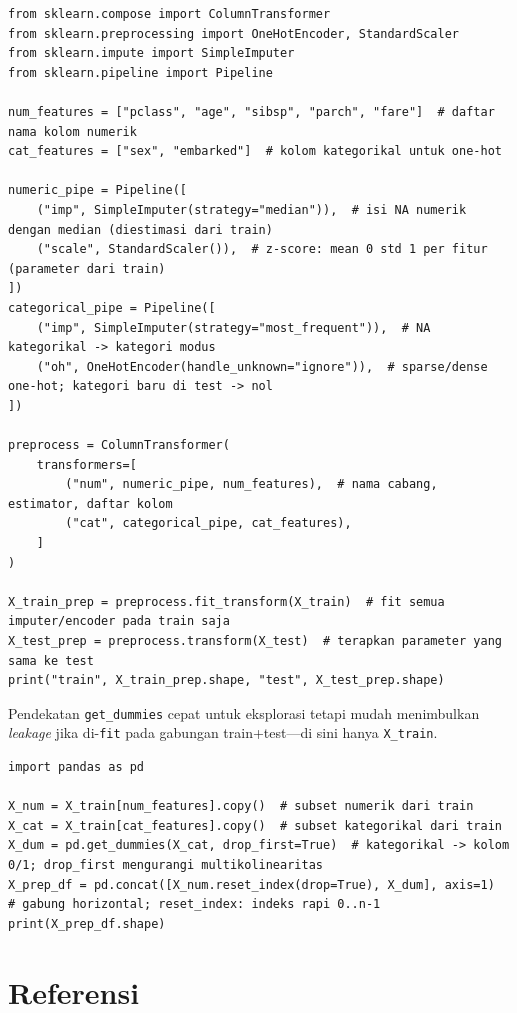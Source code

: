\documentclass[../main.tex]{subfiles}
\begin{document}
\begin{lstlisting}[caption=ColumnTransformer + imputer (polar anti-leakage)]
from sklearn.compose import ColumnTransformer
from sklearn.preprocessing import OneHotEncoder, StandardScaler
from sklearn.impute import SimpleImputer
from sklearn.pipeline import Pipeline

num_features = ["pclass", "age", "sibsp", "parch", "fare"]  # daftar nama kolom numerik
cat_features = ["sex", "embarked"]  # kolom kategorikal untuk one-hot

numeric_pipe = Pipeline([
    ("imp", SimpleImputer(strategy="median")),  # isi NA numerik dengan median (diestimasi dari train)
    ("scale", StandardScaler()),  # z-score: mean 0 std 1 per fitur (parameter dari train)
])
categorical_pipe = Pipeline([
    ("imp", SimpleImputer(strategy="most_frequent")),  # NA kategorikal -> kategori modus
    ("oh", OneHotEncoder(handle_unknown="ignore")),  # sparse/dense one-hot; kategori baru di test -> nol
])

preprocess = ColumnTransformer(
    transformers=[
        ("num", numeric_pipe, num_features),  # nama cabang, estimator, daftar kolom
        ("cat", categorical_pipe, cat_features),
    ]
)

X_train_prep = preprocess.fit_transform(X_train)  # fit semua imputer/encoder pada train saja
X_test_prep = preprocess.transform(X_test)  # terapkan parameter yang sama ke test
print("train", X_train_prep.shape, "test", X_test_prep.shape)
\end{lstlisting}

\MulaiPenjelasanKode Pendekatan \texttt{get\_dummies} cepat untuk eksplorasi tetapi mudah menimbulkan \textit{leakage} jika di-\texttt{fit} pada gabungan train+test---di sini hanya \texttt{X\_train}. \SelesaiPenjelasanKode

\begin{lstlisting}[caption=Alternatif cepat: pandas get\_dummies (tanpa pipeline)]
import pandas as pd

X_num = X_train[num_features].copy()  # subset numerik dari train
X_cat = X_train[cat_features].copy()  # subset kategorikal dari train
X_dum = pd.get_dummies(X_cat, drop_first=True)  # kategorikal -> kolom 0/1; drop_first mengurangi multikolinearitas
X_prep_df = pd.concat([X_num.reset_index(drop=True), X_dum], axis=1)  # gabung horizontal; reset_index: indeks rapi 0..n-1
print(X_prep_df.shape)
\end{lstlisting}

\section{Referensi}
\end{document}
